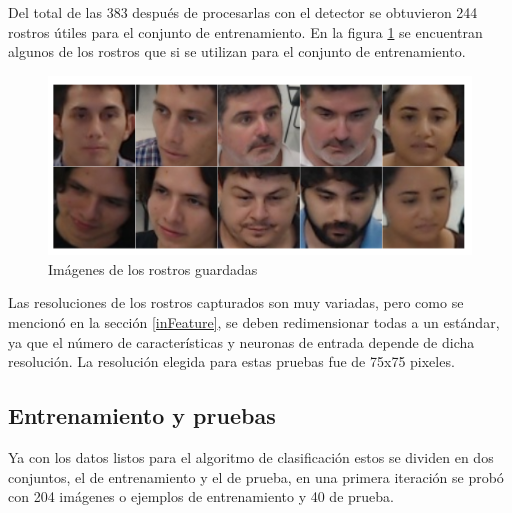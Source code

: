 Del total de las 383 después de procesarlas con el detector se obtuvieron 244 rostros útiles para el conjunto de entrenamiento. En la figura \ref{fig: figFacesLab} se encuentran algunos de los rostros que si se utilizan para el conjunto de entrenamiento.
\begin{figure}[htbp] 
	\centering
	\includegraphics[width=.5\textwidth]{./pictures/facesLab}
	\caption{Imágenes de los rostros guardadas}\label{fig: figFacesLab}
\end{figure}
Las resoluciones de los rostros capturados son muy variadas, pero como se mencionó en la sección \ref{inFeature}, se deben redimensionar todas a un estándar, ya que el número de características y neuronas de entrada depende de dicha resolución. La resolución elegida para estas pruebas fue de 75x75 pixeles.

\subsection{Entrenamiento y pruebas}
Ya con los datos listos para el algoritmo de clasificación estos se dividen en dos conjuntos, el de entrenamiento y el de prueba, en una primera iteración se probó con 204 imágenes o ejemplos de entrenamiento y 40 de prueba. 
